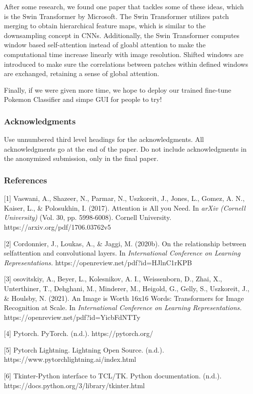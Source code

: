 \documentclass{article} %
\begin{document}
After some  research, we found one paper that tackles some of these ideas, which is the Swin Transformer by Microsoft. The Swin Transformer utilizes patch merging to obtain hierarchical feature maps, which is similar to the downsampling concept in CNNs. Additionally, the Swin Transformer computes window based self-attention instead of gloabl attention to make the computational time increase linearly with image resolution. Shifted windows are introduced to make sure the correlations between patches within defined windows are exchanged, retaining a sense of global attention.

Finally, if we were given more time, we hope to deploy our trained fine-tune Pokemon Classifier and simpe GUI for people to try!

\subsubsection*{Acknowledgments}

Use unnumbered third level headings for the acknowledgments. All
acknowledgments go at the end of the paper. Do not include 
acknowledgments in the anonymized submission, only in the 
final paper. 

\subsubsection*{References}

\small{
[1] Vaswani, A., Shazeer, N., Parmar, N., Uszkoreit, J., Jones, L., 
Gomez, A. N., Kaiser, L., \& Polosukhin, I. (2017). Attention is All 
you Need. In {\it arXiv (Cornell University)} (Vol. 30, pp. 5998-6008). 
Cornell University. https://arxiv.org/pdf/1706.03762v5

[2] Cordonnier, J., Loukas, A., \& Jaggi, M. (2020b). On the 
relationship between selfattention and convolutional layers. In {\it International 
Conference on Learning Representations.} https://openreview.net/pdf?id=HJlnC1rKPB

[3] osovitskiy, A., Beyer, L., Kolesnikov, A. I., Weissenborn, D., Zhai, X., 
Unterthiner, T., Dehghani, M., Minderer, M., Heigold, G., Gelly, S., Uszkoreit, 
J., \& Houlsby, N. (2021). An Image is Worth 16x16 Words: Transformers for Image 
Recognition at Scale. In {\it International Conference on Learning Representations.}
https://openreview.net/pdf?id=YicbFdNTTy

[4] Pytorch. PyTorch. (n.d.). https://pytorch.org/ 

[5] Pytorch Lightning. Lightning Open Source. (n.d.). https://www.pytorchlightning.ai/index.html 

[6] Tkinter-Python interface to TCL/TK. Python documentation. (n.d.). https://docs.python.org/3/library/tkinter.html 

}
\end{document}
